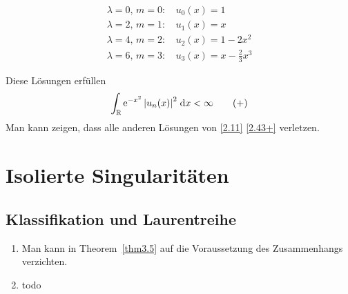 \documentclass[a4paper,twoside,DIV15,BCOR12mm]{scrbook}
\begin{document}
\begin{bsp}
\vspace*{-16pt}
\begin{align*}
\lambda=0,\,m=0\colon\,&u_0(x)=1\\
\lambda=2,\,m=1\colon\,&u_1(x)=x\\
\lambda=4,\,m=2\colon\,&u_2(x)=1-2x^2\\
\lambda=6,\,m=3\colon\,&u_3(x)=x-\frac{2}{3}x^3
\end{align*}

Diese Lösungen erfüllen
\[\label{2.43+}\int_{\mathbb{R}}^{}{\mathrm{e}^{-x^2}\left\lvert u_n(x)\right\lvert^2}\;\mathrm{d} x<\infty\tag{+}\]
Man kann zeigen, dass alle anderen Lösungen von \eqref{2.11} \eqref{2.43+} verletzen.
\end{bsp}


\chapter{Isolierte Singularitäten}

\section{Klassifikation und Laurentreihe}

\begin{dfn}\label{dfn3.1}
\end{dfn}

\begin{bsp}\label{bsp3.2}
\end{bsp}

\begin{thm}\label{thm3.3}
\end{thm}

\begin{bsp}\label{bsp3.4}
\end{bsp}

\begin{thm}\label{thm3.5}
\end{thm}

\begin{bem*}
  \begin{enumerate}
  \item Man kann in Theorem~\ref{thm3.5} auf die Voraussetzung des Zusammenhangs verzichten.
  \item todo %
  \end{enumerate}
\end{bem*}
\end{document}
